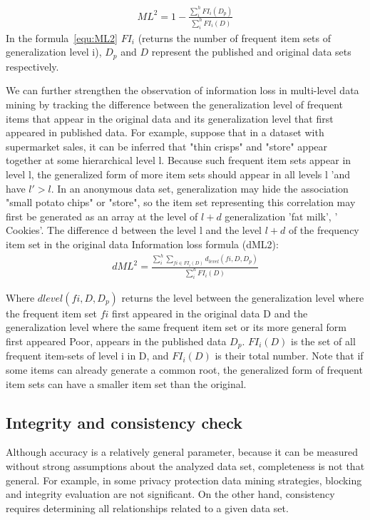 \documentclass[journal,transmag]{IEEEtran}
\begin{document}
\begin{eqnarray}\label{equ:ML2}
ML^2= 1 - \frac{\sum^h_i FI_i(D_p) }{\sum^h_i FI_i(D)}
\end{eqnarray}
In the formula~\ref{equ:ML2} $ FI_i $ (returns the number of frequent item sets of generalization level i), $ D_p $ and $ D $ represent the published and original data sets respectively.

We can further strengthen the observation of information loss in multi-level data mining by tracking the difference between the generalization level of frequent items that appear in the original data and its generalization level that first appeared in published data. For example, suppose that in a dataset with supermarket sales, it can be inferred that "thin crisps" and "store" appear together at some hierarchical level l. Because such frequent item sets appear in level l, the generalized form of more item sets should appear in all levels l 'and have $ l'>l $. In an anonymous data set, generalization may hide the association "small potato chips" or "store", so the item set representing this correlation may first be generated as an array at the level of $l+d$ generalization {'fat milk', ' Cookies'}. The difference d between the level l and the level $l+d$ of the frequency item set in the original data Information loss formula (dML2):
\begin{eqnarray}\label{equ:dML2t}
dML^2= \frac{\sum^h_i\sum_{fi\in FI_i(D)} d_{level} (fi,D,D_p) }{\sum^h_i FI_i(D)}
\end{eqnarray}

Where $dlevel(fi,D,D_p)$ returns the level between the generalization level where the frequent item set $ fi $ first appeared in the original data D and the generalization level where the same frequent item set or its more general form first appeared Poor, appears in the published data $ D_p $. $FI_i(D)$ is the set of all frequent item-sets of level i in D, and $FI_i(D)$ is their total number. Note that if some items can already generate a common root, the generalized form of frequent item sets can have a smaller item set than the original.

\subsection{Integrity and consistency check}
Although accuracy is a relatively general parameter, because it can be measured without strong assumptions about the analyzed data set, completeness is not that general. For example, in some privacy protection data mining strategies, blocking and integrity evaluation are not significant. On the other hand, consistency requires determining all relationships related to a given data set.
\end{document}
